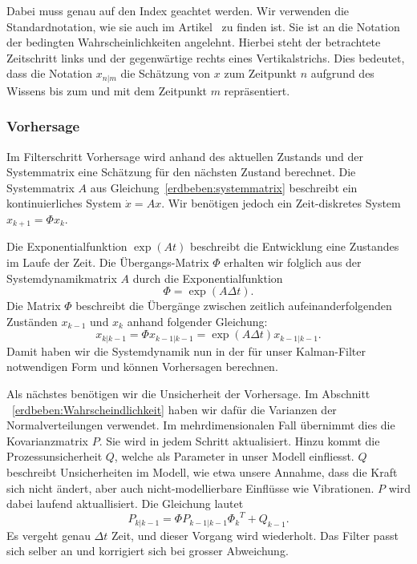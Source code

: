Dabei muss genau auf den Index geachtet werden.
Wir verwenden die Standardnotation, wie sie auch im Artikel~\cite{erdbeben:wikipedia} zu finden ist.
Sie ist an die Notation der bedingten Wahrscheinlichkeiten angelehnt.
Hierbei steht der betrachtete Zeitschritt links und der gegenwärtige rechts eines Vertikalstrichs.
Dies bedeutet, dass die Notation $x_{n|m}$ die Schätzung von $x$ zum Zeitpunkt $n$ 
aufgrund des Wissens bis zum und mit dem Zeitpunkt $m$ repräsentiert.

\subsubsection*{Vorhersage}
Im Filterschritt Vorhersage wird anhand des aktuellen Zustands und der Systemmatrix eine Schätzung für den nächsten Zustand berechnet. 
Die Systemmatrix $A$ aus Gleichung~\eqref{erdbeben:systemmatrix} beschreibt ein kontinuierliches System $\dot x = Ax$.
Wir benötigen jedoch ein Zeit-diskretes System $x_{k+1} = \Phi x_k$.

Die Exponentialfunktion $\exp(At)$ beschreibt die Entwicklung eine Zustandes im Laufe der Zeit.
Die Übergangs-Matrix $\Phi$ erhalten wir folglich aus der Systemdynamikmatrix $A$ durch die Exponentialfunktion
\[\Phi = \exp(A\Delta t). \]
Die Matrix $\Phi$ beschreibt die Übergänge zwischen zeitlich aufeinanderfolgenden Zuständen $x_{k-1}$ und $x_{k}$ anhand folgender Gleichung:
\[
{x_{k|k-1}}=\Phi{x_{k-1|k-1}}= \exp(A\Delta t){x_{k-1|k-1}}.
\] 
Damit haben wir die Systemdynamik nun in der für unser Kalman-Filter notwendigen Form und können Vorhersagen berechnen.

Als nächstes benötigen wir die Unsicherheit der Vorhersage.
Im Abschnitt ~\ref{erdbeben:Wahrscheindlichkeit} haben wir dafür die Varianzen der Normalverteilungen verwendet.
Im mehrdimensionalen Fall übernimmt dies die Kovarianzmatrix $P$.
Sie wird in jedem Schritt aktualisiert.
Hinzu kommt die Prozessunsicherheit $Q$, welche als Parameter in unser Modell einfliesst.
$Q$ beschreibt Unsicherheiten im Modell,
wie etwa unsere Annahme, dass die Kraft sich nicht ändert,
aber auch nicht-modellierbare Einflüsse wie Vibrationen.
$P$ wird dabei laufend aktuallisiert.
Die Gleichung lautet
\[
{P_{k|k-1}}=\Phi {P_{k-1|k-1}} {\Phi _{k}}^T + {Q_{k-1}}.
\] 
Es vergeht genau $\Delta t$ Zeit, und dieser Vorgang wird wiederholt.  
Das Filter passt sich selber an und korrigiert sich bei grosser Abweichung.

